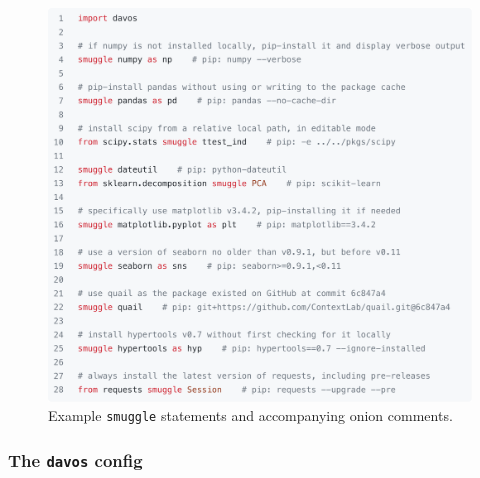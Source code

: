 \documentclass[preprint,12pt, a4paper]{elsarticle}
\begin{document}
\begin{figure}[h]
\centering
\includegraphics[width=\textwidth]{figs/snippets.pdf}
\caption{\small Example \texttt{smuggle} statements and accompanying onion comments.}
\label{fig:snippets}
\end{figure}

%
%
%
%
%

\subsubsection{The \texttt{davos} config}\label{subsec:config}
\end{document}
